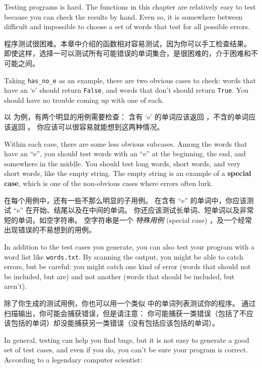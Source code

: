 Testing programs is hard.  The functions in this chapter are
relatively easy to test because you can check the results by hand.
Even so, it is somewhere between difficult and impossible to choose a
set of words that test for all possible errors.

程序测试很困难。本章中介绍的函数相对容易测试，因为你可以手工检查结果。
即使这样，选择一可以测试所有可能错误的单词集合，是很困难的，介于困难和不可能之间。

Taking \verb"has_no_e" as an example, there are two obvious
cases to check: words that have an `e' should return {\tt False}, and
words that don't should return {\tt True}.  You should have no
trouble coming up with one of each.

以  为例，有两个明显的用例需要检查：
含有 `e' 的单词应该返回 ，不含的单词应该返回  。
你应该可以很容易就能想到这两种情况。

Within each case, there are some less obvious subcases.  Among the
words that have an ``e'', you should test words with an ``e'' at the
beginning, the end, and somewhere in the middle.  You should test long
words, short words, and very short words, like the empty string.  The
empty string is an example of a {\bf special case}, which is one of
the non-obvious cases where errors often lurk.

在每个用例中，还有一些不那么明显的子用例。
在含有 ``e'' 的单词中，你应该测试 ``e'' 在开始、结尾以及在中间的单词。
你还应该测试长单词、短单词以及非常短的单词，如空字符串。
空字符串是一个 {\em 特殊用例} (special case) ，及一个经常出现错误的不易想到的用例。

In addition to the test cases you generate, you can also test
your program with a word list like {\tt words.txt}.  By scanning
the output, you might be able to catch errors, but be careful:
you might catch one kind of error (words that should not be
included, but are) and not another (words that should be included,
but aren't).

除了你生成的测试用例，你也可以用一个类似  中的单词列表测试你的程序。 通过扫描输出，你可能会捕获错误，但是请注意：
你可能捕获一类错误（包括了不应该包括的单词）却没能捕获另一类错误（没有包括应该包括的单词）。

In general, testing can help you find bugs, but it is not easy to
generate a good set of test cases, and even if you do, you can't
be sure your program is correct.
According to a legendary computer scientist:

